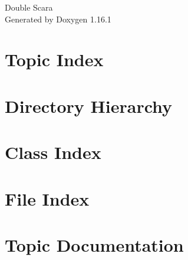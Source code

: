 \documentclass[twoside]{book}
\newcommand{\+}{\discretionary{\mbox{\scriptsize$\hookleftarrow$}}{}{}}
\newcommand{\clearemptydoublepage}{%
    \newpage{\pagestyle{empty}\cleardoublepage}%
  }
\begin{document}
  \raggedbottom
    \hypersetup{pageanchor=false,
                bookmarksnumbered=true,
                pdfencoding=unicode
               }
  \begin{titlepage}
  \vspace*{7cm}
  \begin{center}%
  {\Large Double Scara}\\
  \vspace*{1cm}
  {\large Generated by Doxygen 1.16.1}\\
  \end{center}
  \end{titlepage}
  \clearemptydoublepage
  \tableofcontents
  \clearemptydoublepage
  \hypersetup{pageanchor=true}

\chapter{Topic Index}

\chapter{Directory Hierarchy}

\chapter{Class Index}

\chapter{File Index}

\chapter{Topic Documentation}





















\end{document}
